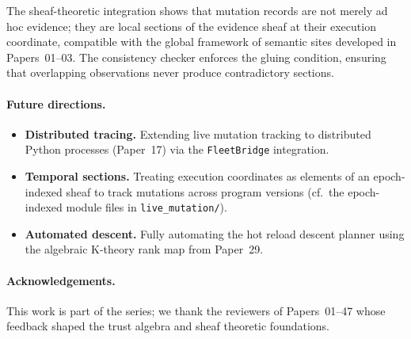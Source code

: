 \documentclass[11pt]{article}
\begin{document}
The sheaf-theoretic integration shows that mutation records are not
merely ad hoc evidence; they are local sections of the evidence sheaf
at their execution coordinate, compatible with the global framework
of semantic sites developed in Papers~01--03.  The consistency checker
enforces the gluing condition, ensuring that overlapping observations
never produce contradictory sections.

\paragraph{Future directions.}
\begin{itemize}
\item \textbf{Distributed tracing.} Extending live mutation tracking
  to distributed Python processes (Paper~17) via the
  \texttt{FleetBridge} integration.
\item \textbf{Temporal sections.} Treating execution coordinates as
  elements of an epoch-indexed sheaf to track mutations across
  program versions (cf.\ the epoch-indexed module files in
  \texttt{live\_mutation/}).
\item \textbf{Automated descent.} Fully automating the hot reload
  descent planner using the algebraic K-theory rank map from
  Paper~29.
\end{itemize}

\paragraph{Acknowledgements.}
This work is part of the \JuGeo{} series; we thank the reviewers of
Papers~01--47 whose feedback shaped the trust algebra and sheaf
theoretic foundations.
\end{document}
